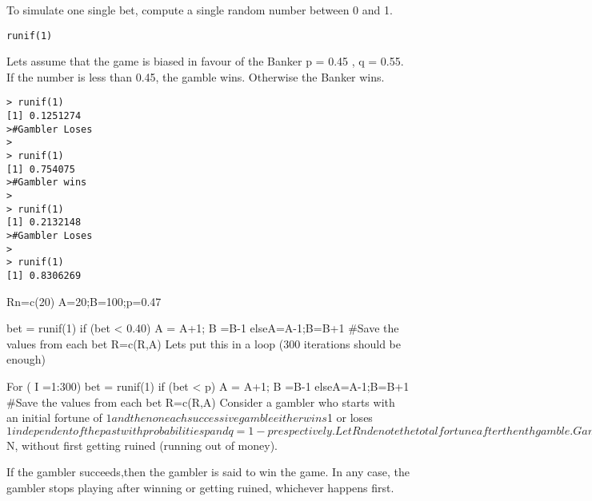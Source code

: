 To simulate one single bet, compute a single random number between 0 and 1.
\begin{framed}
\begin{verbatim}
runif(1)
\end{verbatim}
\end{framed}

Lets assume that the game is biased in favour of the Banker
p = 0.45 , q = 0.55.
If the number is less than 0.45, the gamble wins. Otherwise the Banker wins.

\begin{verbatim}
> runif(1)
[1] 0.1251274
>#Gambler Loses
>
> runif(1)
[1] 0.754075
>#Gambler wins
>
> runif(1)
[1] 0.2132148
>#Gambler Loses
>
> runif(1)
[1] 0.8306269
\end{verbatim}



Rn=c(20)
A=20;B=100;p=0.47
 
 
bet = runif(1)
if (bet < 0.40)
{
A = A+1; B =B-1
}else{A=A-1;B=B+1}
#Save the values from each bet
R=c(R,A)
Lets put this in a loop (300 iterations should be enough)
 
For ( I =1:300)
{
bet = runif(1)
if (bet < p)
{
A = A+1; B =B-1
}else{A=A-1;B=B+1}
#Save the values from each bet
R=c(R,A)
}
Consider a gambler who starts with an initial fortune of $1 and then on each successive gamble either wins $1 or loses $1 independent of the past with probabilities p and q = 1-p respectively.

Let Rn denote the total fortune after the nth gamble.

Game:  coin toss 
Gambler wins if coin throw is “heads”
	Banker wins if coint throw is “tails”. 
Probability of success (heads) : p
Probability of failure (tails) : q 	(where q =  1 - p )

Ratio of success probability to failure success:	s = p / q

Game is over if Gambler wins the jackpot
Gamler loses everything

The gambler’s objective is to reach a total fortune of $N, without first getting ruined (running out of money). 

If the gambler succeeds,then the gambler is said to win the game. In any case, the gambler stops playing after winning or getting ruined, whichever happens first. 


